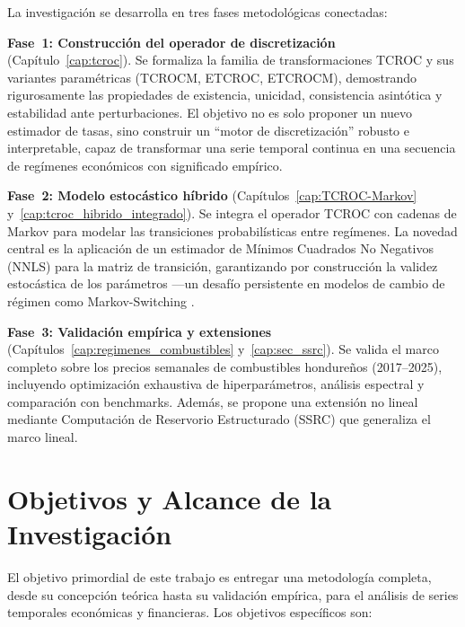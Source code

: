 La investigación se desarrolla en tres fases metodológicas
conectadas:

\textbf{Fase~1: Construcción del operador de discretización}
(Capítulo~\ref{cap:tcroc}).  Se formaliza la familia de
transformaciones TCROC y sus variantes paramétricas (TCROCM, ETCROC,
ETCROCM), demostrando rigurosamente las propiedades de existencia,
unicidad, consistencia asintótica y estabilidad ante
perturbaciones.  El
objetivo no es solo proponer un nuevo estimador de tasas, sino
construir un ``motor de discretización'' robusto e interpretable,
capaz de transformar una serie temporal continua en una secuencia de
regímenes económicos con significado empírico.

\textbf{Fase~2: Modelo estocástico híbrido}
(Capítulos~\ref{cap:TCROC-Markov}
y~\ref{cap:tcroc_hibrido_integrado}).  Se integra el operador TCROC
con cadenas de Markov para modelar las transiciones probabilísticas
entre regímenes.  La novedad central es la aplicación de un estimador
de Mínimos Cuadrados No Negativos (NNLS) para la matriz de
transición, garantizando por construcción la validez estocástica de
los parámetros ---un desafío persistente en modelos de cambio de
régimen como Markov-Switching \cite{Hamilton1994}.

\textbf{Fase~3: Validación empírica y extensiones}
(Capítulos~\ref{cap:regimenes_combustibles}
y~\ref{cap:sec_ssrc}).  Se valida el marco completo sobre los
precios semanales de combustibles hondureños (2017--2025), incluyendo
optimización exhaustiva de hiperparámetros, análisis espectral y
comparación con benchmarks.  Además, se propone una extensión no
lineal mediante Computación de Reservorio Estructurado (SSRC) que
generaliza el marco lineal.

\section{Objetivos y Alcance de la Investigación}
\label{sec:objetivos}

El objetivo primordial de este trabajo es entregar una metodología
completa, desde su concepción teórica hasta su validación empírica,
para el análisis de series temporales económicas y financieras.  Los
objetivos específicos son:

